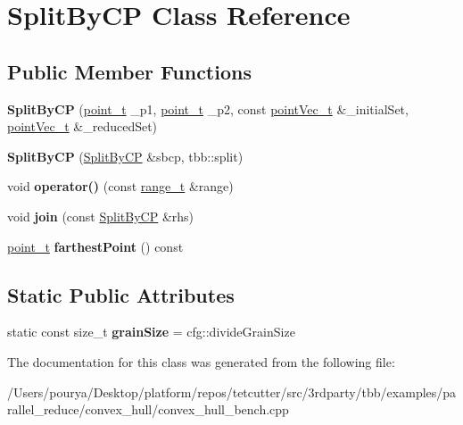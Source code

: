 \hypertarget{classSplitByCP}{}\section{Split\+By\+C\+P Class Reference}
\label{classSplitByCP}
\subsection*{Public Member Functions}
\begin{DoxyCompactItemize}
\item 
\hypertarget{classSplitByCP_ae4a09f5df9ec5ef03c1665257d81294b}{}{\bfseries Split\+By\+C\+P} (\hyperlink{structutil_1_1point}{point\+\_\+t} \+\_\+p1, \hyperlink{structutil_1_1point}{point\+\_\+t} \+\_\+p2, const \hyperlink{classtbb_1_1concurrent__vector}{point\+Vec\+\_\+t} \&\+\_\+initial\+Set, \hyperlink{classtbb_1_1concurrent__vector}{point\+Vec\+\_\+t} \&\+\_\+reduced\+Set)\label{classSplitByCP_ae4a09f5df9ec5ef03c1665257d81294b}

\item 
\hypertarget{classSplitByCP_a1edfaffa42302a1355aef03d1e22b610}{}{\bfseries Split\+By\+C\+P} (\hyperlink{classSplitByCP}{Split\+By\+C\+P} \&sbcp, tbb\+::split)\label{classSplitByCP_a1edfaffa42302a1355aef03d1e22b610}

\item 
\hypertarget{classSplitByCP_af5d8c2328564650743d03deeffa54005}{}void {\bfseries operator()} (const \hyperlink{classtbb_1_1blocked__range}{range\+\_\+t} \&range)\label{classSplitByCP_af5d8c2328564650743d03deeffa54005}

\item 
\hypertarget{classSplitByCP_a57ed9121105c5524f65d093313332543}{}void {\bfseries join} (const \hyperlink{classSplitByCP}{Split\+By\+C\+P} \&rhs)\label{classSplitByCP_a57ed9121105c5524f65d093313332543}

\item 
\hypertarget{classSplitByCP_a1702b1a8a7854e4ed657c6c90d5fe911}{}\hyperlink{structutil_1_1point}{point\+\_\+t} {\bfseries farthest\+Point} () const \label{classSplitByCP_a1702b1a8a7854e4ed657c6c90d5fe911}

\end{DoxyCompactItemize}
\subsection*{Static Public Attributes}
\begin{DoxyCompactItemize}
\item 
\hypertarget{classSplitByCP_a305f3f6ba934205218710fd2947b7f16}{}static const size\+\_\+t {\bfseries grain\+Size} = cfg\+::divide\+Grain\+Size\label{classSplitByCP_a305f3f6ba934205218710fd2947b7f16}

\end{DoxyCompactItemize}


The documentation for this class was generated from the following file\+:\begin{DoxyCompactItemize}
\item 
/\+Users/pourya/\+Desktop/platform/repos/tetcutter/src/3rdparty/tbb/examples/parallel\+\_\+reduce/convex\+\_\+hull/convex\+\_\+hull\+\_\+bench.\+cpp\end{DoxyCompactItemize}
